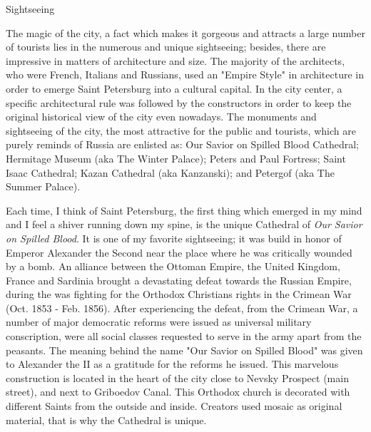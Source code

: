 \documentclass[10pt,a4paper]{article} %
\newcommand{\NewsItem}[1]{ %
\usefont{T1}{fvs}{n}{n} %
\vspace{24pt}\large #1\vspace{3pt} %
\par \normalsize \normalfont}
\begin{document}
\begin{multicols}{3} %



\NewsItem{Sightseeing}

The magic of the city, a fact which makes it gorgeous and attracts 
a large number of tourists lies in the numerous and unique sightseeing; 
besides, there are impressive in matters of architecture and size. 
The majority of the architects, who were French, Italians and Russians, 
used an "Empire Style" in architecture in order to emerge Saint Petersburg 
into a cultural capital. 
In the city center, a specific architectural rule was followed 
by the constructors in order to keep the original historical view of the city even nowadays. 
The monuments and sightseeing of the city, the most attractive for the public and tourists, 
which are purely reminds of Russia are enlisted as: Our Savior on Spilled Blood Cathedral; 
Hermitage Museum (aka The Winter Palace); Peters and Paul Fortress; Saint Isaac Cathedral; 
Kazan Cathedral (aka Kanzanski); and Petergof (aka The Summer Palace).

Each time, I think of Saint Petersburg, the first thing which emerged in my mind and 
I feel a shiver running down my spine, is the unique Cathedral 
of \textit{Our Savior on Spilled Blood}. 
It is one of my favorite sightseeing; it was build in honor of Emperor Alexander 
the Second near the place where he was critically wounded by a bomb. 
An alliance between the Ottoman Empire, the United Kingdom, 
France and Sardinia brought a devastating defeat towards the Russian Empire, 
during the was fighting for the Orthodox Christians rights in the Crimean War 
(Oct. 1853 - Feb. 1856). 
After experiencing the defeat, from the Crimean War, 
a number of major democratic reforms were issued as universal military conscription, 
were all social classes requested to serve in the army apart from the peasants. 
The meaning behind the name "Our Savior on Spilled Blood" was given to 
Alexander the II as a gratitude for the reforms he issued. 
This marvelous construction is located in the heart of the city close 
to Nevsky Prospect (main street), and next to Griboedov Canal. 
This Orthodox church is decorated with different Saints from the outside and inside. 
Creators used mosaic as original material, that is why the Cathedral is unique.


\end{multicols}
\end{document}
